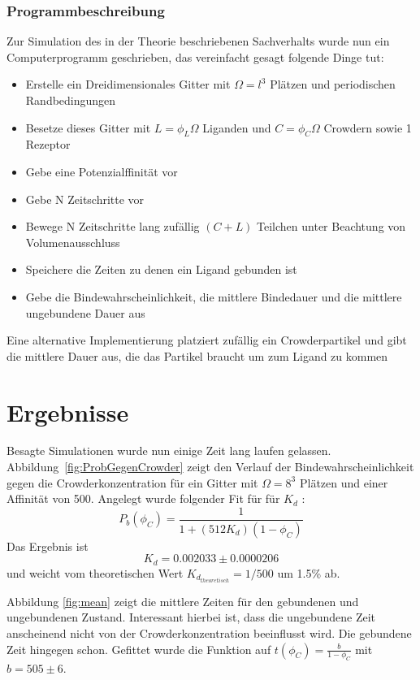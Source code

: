 \documentclass[bachelor,       %
               twoside,        %
               BCOR10mm,       %
               english,ngerman, %
               ]{GAUBM}
\begin{document}
\subsection{Programmbeschreibung}
Zur Simulation des in der Theorie beschriebenen Sachverhalts wurde nun ein Computerprogramm geschrieben, das
vereinfacht gesagt folgende Dinge tut:
\begin{itemize}
\item Erstelle ein Dreidimensionales Gitter mit $\Omega = l^3$ Plätzen und periodischen Randbedingungen
\item Besetze dieses Gitter mit $L = \phi_L\Omega$ Liganden und $C = \phi_C\Omega$ Crowdern sowie 1 Rezeptor
\item Gebe eine Potenzialffinität vor
\item Gebe N Zeitschritte vor
\item Bewege N Zeitschritte lang zufällig $(C+L)$ Teilchen unter Beachtung von Volumenausschluss
\item Speichere die Zeiten zu denen ein Ligand gebunden ist
\item Gebe die Bindewahrscheinlichkeit, die mittlere Bindedauer und die mittlere ungebundene Dauer aus
\end{itemize}
Eine alternative Implementierung platziert zufällig ein Crowderpartikel und gibt
die mittlere Dauer aus, die das Partikel braucht um zum Ligand zu kommen


\chapter{Ergebnisse}
Besagte Simulationen wurde nun einige Zeit lang laufen gelassen.
Abbildung~\ref{fig:ProbGegenCrowder} zeigt den Verlauf der Bindewahrscheinlichkeit
gegen die Crowderkonzentration für ein Gitter mit $\Omega = 8^3$ Plätzen und einer
Affinität von 500. Angelegt wurde folgender Fit für für $K_d$ :
\begin{equation}
P_b(\phi_C) = \frac{1}{1+(512K_d)(1-\phi_C)}
\end{equation}
Das Ergebnis ist
\begin{equation}
K_d = 0.002033 \pm 0.0000206
\end{equation}
und weicht vom theoretischen Wert $K_{d_{theoretisch}} = 1/500 $ um 1.5\% ab.

Abbildung \ref{fig:mean} zeigt die mittlere Zeiten für den gebundenen und ungebundenen
Zustand. Interessant hierbei ist, dass die ungebundene Zeit anscheinend nicht von
der Crowderkonzentration beeinflusst wird. Die gebundene Zeit hingegen schon.
Gefittet wurde die Funktion auf $t(\phi_C) = \frac{b}{1-\phi_C}$ mit $b = 505 \pm 6$.
\end{document}
